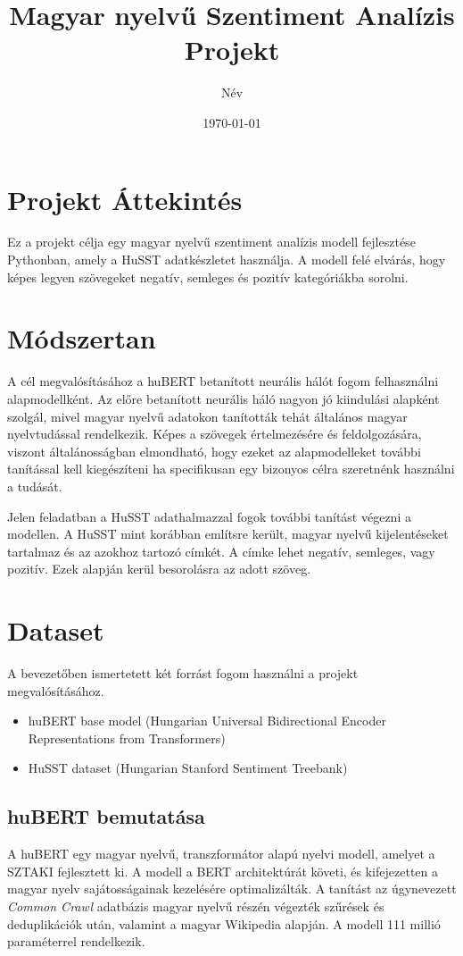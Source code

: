 \documentclass[12pt]{article}
\title{Magyar nyelvű Szentiment Analízis Projekt}
\author{Név}
\date{\today}
\begin{document}
\maketitle
\newpage

\tableofcontents
\newpage

\section{Projekt Áttekintés}
Ez a projekt célja egy magyar nyelvű szentiment analízis modell fejlesztése Pythonban, amely a HuSST adatkészletet használja. A modell felé elvárás, hogy képes legyen szövegeket negatív, semleges és pozitív kategóriákba sorolni.

\section{Módszertan}
A cél megvalósításához a huBERT betanított neurális hálót fogom felhasználni alapmodellként. Az előre betanított neurális háló nagyon jó kiindulási alapként szolgál, mivel magyar nyelvű adatokon tanították tehát általános magyar nyelvtudással rendelkezik. Képes a szövegek értelmezésére és feldolgozására, viszont általánosságban elmondható, hogy ezeket az alapmodelleket további tanítással kell kiegészíteni ha specifikusan egy bizonyos célra szeretnénk használni a tudását.

Jelen feladatban a HuSST adathalmazzal fogok további tanítást végezni a modellen. A HuSST mint korábban említsre került, magyar nyelvű kijelentéseket tartalmaz és az azokhoz tartozó címkét. A címke lehet negatív, semleges, vagy pozitív. Ezek alapján kerül besorolásra az adott szöveg. 


\section{Dataset}
A bevezetőben ismertetett két forrást fogom használni a projekt megvalósításához.
\begin{itemize}
    \item huBERT base model (Hungarian Universal Bidirectional Encoder Representations from Transformers)
    \item HuSST dataset (Hungarian Stanford Sentiment Treebank)
\end{itemize}

\subsection{huBERT bemutatása}
A huBERT egy magyar nyelvű, transzformátor alapú nyelvi modell, amelyet a SZTAKI fejlesztett ki. A modell a BERT architektúrát követi, és kifejezetten a magyar nyelv sajátosságainak kezelésére optimalizálták. A tanítást az úgynevezett \textit{Common Crawl} adatbázis magyar nyelvű részén végezték szűrések és deduplikációk után, valamint a magyar Wikipedia alapján. A modell 111 millió paraméterrel rendelkezik.
\end{document}
